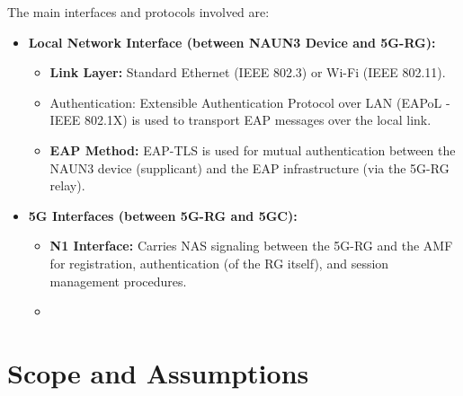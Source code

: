 The main interfaces and protocols involved are:
\begin{itemize}
    \item {
        \textbf{Local Network Interface (between \ac{NAUN3} Device and \ac{5G-RG}):}
        \begin{itemize}
            \item \textbf{Link Layer:} Standard Ethernet (\ac{IEEE} 802.3) or Wi-Fi (\ac{IEEE} 802.11).
            \item {Authentication:} Extensible Authentication Protocol over \ac{LAN} (\ac{EAPoL} - \ac{IEEE} 802.1X) is used to transport \ac{EAP} messages over the local link.
            \item \textbf{EAP Method:} \ac{EAP-TLS} is used for mutual authentication between the \ac{NAUN3} device (supplicant) and the \ac{EAP} infrastructure (via the \ac{5G-RG} relay).
        \end{itemize}
    }
    \item {
        \textbf{\ac{5G} Interfaces (between \ac{5G-RG} and \ac{5GC}):}
        \begin{itemize}
            \item \textbf{N1 Interface:} Carries \ac{NAS} signaling between the \ac{5G-RG} and the \ac{AMF} for registration, authentication (of the \ac{RG} itself), and session management procedures.
            \item 
        \end{itemize}
    }
\end{itemize}

\section{Scope and Assumptions}

